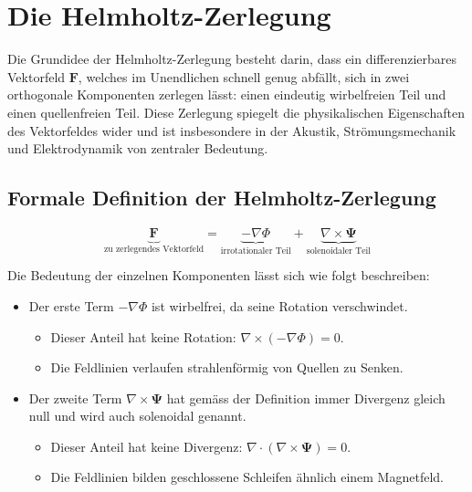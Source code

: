 %
%
%
%
\section{Die Helmholtz-Zerlegung
\label{helmholtz:section:Helmholtz_Zerlegung}}

Die Grundidee der Helmholtz-Zerlegung besteht darin, dass ein differenzierbares  Vektorfeld $\mathbf{F}$, welches im Unendlichen schnell genug abfällt, sich in zwei orthogonale Komponenten zerlegen lässt: einen eindeutig wirbelfreien Teil und einen quellenfreien Teil. Diese Zerlegung spiegelt die physikalischen Eigenschaften des Vektorfeldes wider und ist insbesondere in der Akustik, Strömungsmechanik und Elektrodynamik von zentraler Bedeutung.

\subsection{Formale Definition der Helmholtz-Zerlegung
\label{helmholtz:subsection:def_Helmholtz_Zerlegung}}

\begin{equation}
\underbrace{\mathbf{F}}_{\text{zu zerlegendes Vektorfeld}} = \underbrace{-\nabla \Phi}_{\text{irrotationaler Teil}} + \underbrace{\nabla \times \mathbf{\Psi}}_{\text{solenoidaler Teil}}
\label{helmholtz:equationAllgemein}
\end{equation}

Die Bedeutung der einzelnen Komponenten lässt sich wie folgt beschreiben:

\begin{itemize}
\item Der erste Term $ -\nabla \Phi $ ist wirbelfrei, da seine Rotation verschwindet.
\begin{itemize}
\item Dieser Anteil hat keine Rotation: $\nabla \times (-\nabla \Phi) = 0$.
\item Die Feldlinien verlaufen strahlenförmig von Quellen zu Senken.
\end{itemize}

\item Der zweite Term $\nabla \times \mathbf{\Psi}$ hat gemäss der Definition immer Divergenz gleich null und wird auch solenoidal genannt.
\begin{itemize}
\item Dieser Anteil hat keine Divergenz: $\nabla \cdot (\nabla \times \mathbf{\Psi}) = 0$.
\item Die Feldlinien bilden geschlossene Schleifen ähnlich einem Magnetfeld.
\end{itemize}
\end{itemize}

